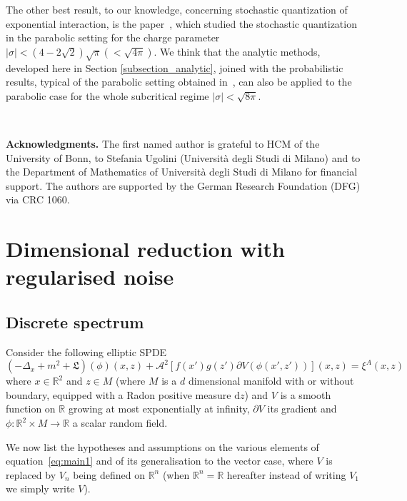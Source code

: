 \documentclass[a4paper,10pt]{article}
\newcommand{\mathd}{\mathrm{d}}
\newcommand{\tmtextbf}[1]{{\bfseries{#1}}}
\begin{document}
The other best result, to our knowledge, concerning stochastic quantization of
exponential interaction, is the paper~{\cite{Garban2018}}, which studied the
stochastic quantization in the parabolic setting for the charge parameter $|
\sigma | < \left( 4 - 2 \sqrt{2} \right) \sqrt{\pi} \left( < \sqrt{4 \pi}
\right)$. We think that the analytic methods, developed here in Section
\ref{subsection_analytic}, joined with the probabilistic results, typical of
the parabolic setting obtained in~{\cite{Garban2018}}, can also be applied to
the parabolic case for the whole subcritical regime $| \sigma | < \sqrt{8
\pi}$.

\

\tmtextbf{Acknowledgments.} The first named author is grateful to HCM of the
University of Bonn, to Stefania Ugolini (Universit{\`a} degli Studi di Milano)
and to the Department of Mathematics of Universit{\`a} degli Studi di Milano
for financial support. The authors are supported by the German Research
Foundation (DFG) via CRC 1060.

\section{Dimensional reduction with regularised noise}\label{section_discrete}

\subsection{Discrete spectrum}\label{section_discrete1}

Consider the following elliptic SPDE
\begin{equation}
  (- \Delta_x + m^2 + \mathfrak{L}) (\phi) (x, z) + \mathcal{A}^2 [f (x') g
  (z') \partial V (\phi (x', z'))] (x, z) = \xi^A (x, z)  \label{eq:main1}
\end{equation}
where $x \in \mathbb{R}^2$ and $z \in M$ (where $M$ is a $d$ dimensional
manifold with or without boundary, equipped with a Radon positive measure
$\mathd z$) and $V$ is a smooth function on $\mathbb{R}$ growing at most
exponentially at infinity, $\partial V$ its gradient and $\phi : \mathbb{R}^2
\times M \rightarrow \mathbb{R}$ a scalar random field.

We now list the hypotheses and assumptions on the various elements of
equation~{\eqref{eq:main1}} and of its generalisation to the vector case,
where $V$ is replaced by $V_n$ being defined on $\mathbb{R}^n$ (when
$\mathbb{R}^n =\mathbb{R}$ hereafter instead of writing $V_1$ we simply write
$V$).
\end{document}

